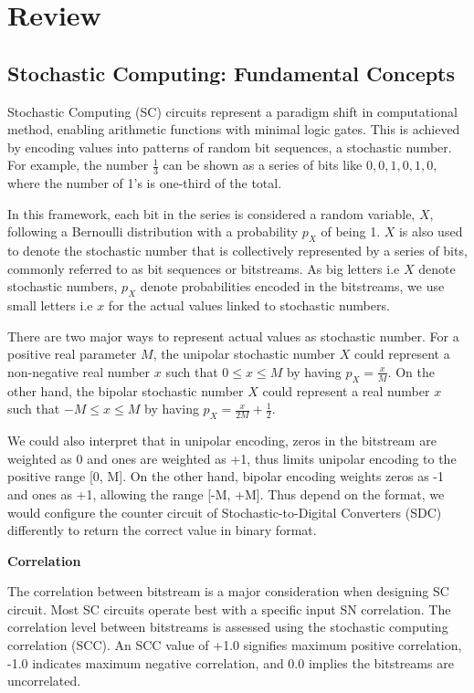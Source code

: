 %
\chapter{Review}
\label{sec:review}

\section{Stochastic Computing: Fundamental Concepts}
\label{sec:review:sec1}

Stochastic Computing (SC) circuits represent a paradigm shift in computational method, enabling arithmetic functions with minimal logic gates. This is achieved by  encoding values into patterns of random bit sequences, a stochastic number. For example, the number $\frac{1}{3}$ can be shown as a series of bits like $0, 0, 1, 0, 1, 0$, where the number of 1's is one-third of the total.

In this framework, each bit in the series is considered a random variable, $X$, following a Bernoulli distribution with a probability $p_X$ of being 1. $X$ is also used to denote the stochastic number that is collectively represented by a series of bits, commonly referred to as bit sequences or bitstreams. As big letters i.e $X$ denote stochastic numbers, $p_X$ denote probabilities encoded in the bitstreams, we use small letters i.e $x$ for the actual values linked to stochastic numbers.

There are two major ways to represent actual values as stochastic number. For a positive real parameter $M$, the unipolar stochastic number $X$ could represent a non-negative real number $x$ such that $0 \leq x \leq M$ by having $p_X = \frac{x}{M} $. On the other hand, the bipolar stochastic number $X$ could represent a real number $x$ such that $-M \leq x \leq M$ by having $p_X  = \frac{x}{2M} + \frac{1}{2}$.

We could also interpret that in unipolar encoding, zeros in the bitstream are weighted as 0 and ones are weighted as +1, thus limits unipolar encoding to the positive range [0, M]. On the other hand, bipolar encoding weights zeros as -1 and ones as +1, allowing the range [-M, +M]. Thus depend on the format, we would configure the counter circuit of Stochastic-to-Digital Converters (SDC) differently to return the correct value in binary format. 


\textbf {Correlation}

The correlation between bitstream is a major consideration when designing SC circuit. Most SC circuits operate best with a specific input SN correlation. The correlation level between bitstreams is assessed using the stochastic computing correlation (SCC). An SCC value of +1.0 signifies maximum positive correlation, -1.0 indicates maximum negative correlation, and 0.0 implies the bitstreams are uncorrelated. 

